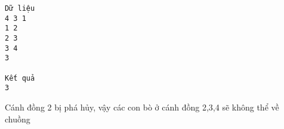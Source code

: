 \begin{verbatim}
Dữ liệu
4 3 1
1 2
2 3
3 4
3

Kết quả
3
\end{verbatim}
Cánh đồng 2 bị phá hủy, vậy các con bò ở cánh đồng 2,3,4 sẽ không thể về chuồng